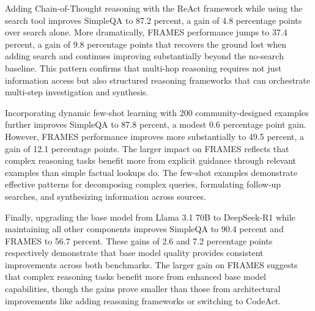 Adding Chain-of-Thought reasoning with the ReAct framework while using the search tool improves SimpleQA to 87.2 percent, a gain of 4.8 percentage points over search alone. More dramatically, FRAMES performance jumps to 37.4 percent, a gain of 9.8 percentage points that recovers the ground lost when adding search and continues improving substantially beyond the no-search baseline. This pattern confirms that multi-hop reasoning requires not just information access but also structured reasoning frameworks that can orchestrate multi-step investigation and synthesis.

Incorporating dynamic few-shot learning with 200 community-designed examples further improves SimpleQA to 87.8 percent, a modest 0.6 percentage point gain. However, FRAMES performance improves more substantially to 49.5 percent, a gain of 12.1 percentage points. The larger impact on FRAMES reflects that complex reasoning tasks benefit more from explicit guidance through relevant examples than simple factual lookups do. The few-shot examples demonstrate effective patterns for decomposing complex queries, formulating follow-up searches, and synthesizing information across sources.

Finally, upgrading the base model from Llama 3.1 70B to DeepSeek-R1 while maintaining all other components improves SimpleQA to 90.4 percent and FRAMES to 56.7 percent. These gains of 2.6 and 7.2 percentage points respectively demonstrate that base model quality provides consistent improvements across both benchmarks. The larger gain on FRAMES suggests that complex reasoning tasks benefit more from enhanced base model capabilities, though the gains prove smaller than those from architectural improvements like adding reasoning frameworks or switching to CodeAct.

